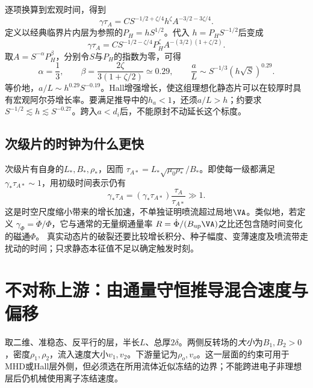 逐项换算到宏观时间，得到
\begin{equation}
 \gamma\tau_A=C S^{-1/2+\zeta/4}h^{\zeta}
 A^{-3/2-3\zeta/4}.
\end{equation}
定义以经典临界片内层为参照的$P_H=hS^{1/2}$。代入
$h=P_HS^{-1/2}$后变成
\begin{equation}
 \gamma\tau_A=C S^{-1/2-\zeta/4}P_H^\zeta
 A^{-(3/2)(1+\zeta/2)}.
\end{equation}
取$A=S^{-\alpha}P_H^\beta$，分别令$S$与$P_H$的指数为零，可得
\begin{equation}
 \alpha=\frac13,\qquad
 \beta=\frac{2\zeta}{3(1+\zeta/2)}\simeq0.29,
 \qquad
 \boxed{\frac{a}{L}\sim S^{-1/3}(h\sqrt S)^{0.29}}.
\end{equation}
等价地，$a/L\sim h^{0.29}S^{-0.19}$。Hall增强增长，使这组理想化静态片可以在较厚时具有宏观阿尔芬增长率。要满足推导中的$h_a<1$，还须$a/L>h$；约要求
$S^{-1/2}\lesssim h\lesssim S^{-0.27}$。跨入$a<d_i$后，不能原封不动延长这个标度。

\subsection{次级片的时钟为什么更快}
次级片有自身的$L_*,B_*,\rho_*$，因而
$\tau_{A*}=L_*\sqrt{\mu_0\rho_*}/B_*$。即使每一级都满足
$\gamma_*\tau_{A*}\sim1$，用初级时间表示仍有
\begin{equation}
 \gamma_*\tau_A=(\gamma_*\tau_{A*})\frac{\tau_A}{\tau_{A*}}\gg1.
\end{equation}
这是时空尺度缩小带来的增长加速，不单独证明喷流超过局地$\VA$。类似地，若定义
$\gamma_\Phi=\dot\Phi/\Phi$，它与通常的无量纲通量率
$R=\dot\Phi/(B_{\rm up}\VA)$之比还包含随时间变化的磁通$\Phi$。
真实动态片的破裂还要比较增长积分、种子幅度、变薄速度及喷流带走扰动的时间；只求静态本征值不足以确定触发时刻。

\section{不对称上游：由通量守恒推导混合速度与偏移}
取二维、准稳态、反平行的层，半长$L$、总厚$2\delta$。两侧反转场的\emph{大小}为$B_1,B_2>0$，密度$\rho_1,\rho_2$，流入速度大小$v_1,v_2$。下游量记为$\rho_o,v_o$。这一层面的约束可用于MHD或Hall层外侧，但必须选在所用流体近似冻结的边界；不能跨进电子非理想层后仍机械使用离子冻结速度。\citep{Cassak2007,Cassak2008}

